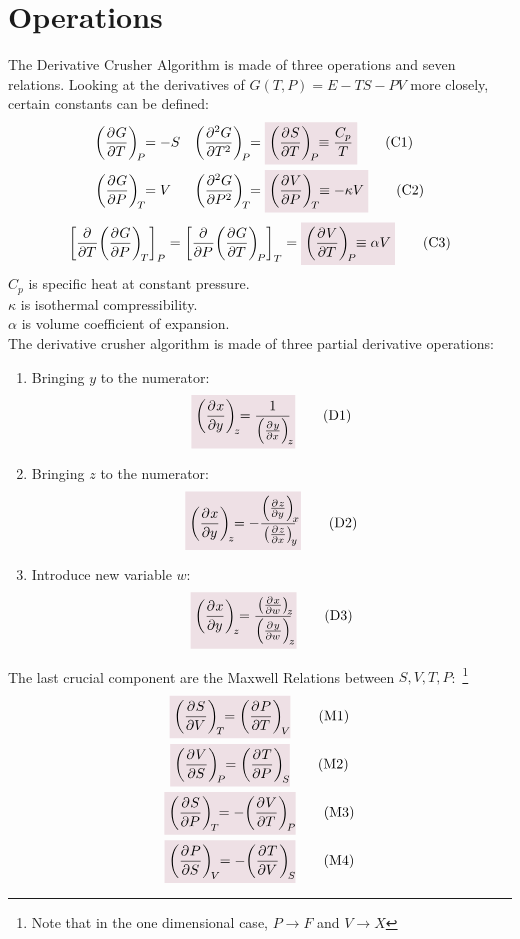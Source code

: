 \documentclass{article}
\begin{document}
\section*{Operations}
    The Derivative Crusher Algorithm is made of three operations and seven relations. 
    Looking at the derivatives of $G(T,P)=E-TS-PV$ more closely, certain constants can be defined: 
    \begin{align*}
        \pder{G}{T}[P]&=-S & \pder[2]{G}{T}[P]&=\coloredanswer{\pder{S}{T}[P]\equiv\frac{C_p}{T}}\tag{C1}\label{C1}
        \\
        \pder{G}{P}[T]&=V & \pder[2]{G}{P}[T]&=\coloredanswer{\pder{V}{P}[T]\equiv-\kappa V}\tag{C2}\label{C2}
    \end{align*}
    \begin{equation*}
        \qty[\pder{T}\pder{G}{P}[T]~]_{P}=\qty[\pder{P}\pder{G}{T}[P]~]_{T}=\coloredanswer{\pder{V}{T}[P]\equiv \alpha V}\tag{C3}\label{C3} %
    \end{equation*}
    $C_p$ is specific heat at constant pressure. 
    \\
    $\kappa$ is isothermal compressibility.
    \\
    $\alpha$ is volume coefficient of expansion.
    \\
    The derivative crusher algorithm is made of three partial derivative operations:
    \begin{enumerate}
        \item Bringing $y$ to the numerator:
        \begin{equation*}
            \coloredanswer{\pder{x}{y}[z]=\oo{\pder{y}{x}[z]}}\tag{D1}\label{D1}
        \end{equation*}
        \item Bringing $z$ to the numerator:
        \begin{equation*}
            \coloredanswer{\pder{x}{y}[z]=-\frac{\pder{z}{y}[x]}{\pder{z}{x}[y]}}\tag{D2}\label{D2}
        \end{equation*}
        \item Introduce new variable $w$:
        \begin{equation*}
            \coloredanswer{\pder{x}{y}[z]=\frac{\pder{x}{w}[z]}{\pder{y}{w}[z]}}\tag{D3}\label{D3}
        \end{equation*}
    \end{enumerate}
    The last crucial component are the Maxwell Relations between $S,V,T,P$:~\footnote{Note that in the one dimensional case, $P\rightarrow F$ and $V\rightarrow X$}
    \begin{gather*}
        \coloredanswer{\pder{S}{V}[T]=\pder{P}{T}[V]}\tag{M1}\label{M1} %
        \\
        \coloredanswer{\pder{V}{S}[P]=\pder{T}{P}[S]}\tag{M2}\label{M2}
        \\
        \coloredanswer{\pder{S}{P}[T]=-\pder{V}{T}[P]}\tag{M3}\label{M3}
        \\
        \coloredanswer{\pder{P}{S}[V]=-\pder{T}{V}[S]}\tag{M4}\label{M4}
    \end{gather*}
    \newpage
\end{document}
